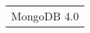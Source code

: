 \documentclass[]{hackathons}
\begin{document}
\begin{minipage}[t]{0.32\textwidth}

\section{} 
\begin{tabular}{@{}r}
MongoDB 4.0 \\
\end{tabular}


\end{minipage} 
\end{document}
